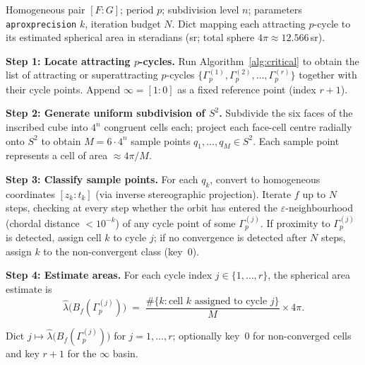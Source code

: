 \documentclass[12pt]{article}
\theoremstyle{definition}
\newcommand{\Bf}{B_f}
\newcommand{\hpair}{[F:G]}
\begin{document}
\begin{algorithm}[h]
\caption{Spherical basin measure for $p$-cycles of $f=\hpair$}
\label{alg:measure}
\begin{algorithmic}[1]
\Require Homogeneous pair $\hpair$; period $p$; subdivision level $n$;
         parameters \texttt{aproxprecision} $k$, iteration budget $N$.
\Ensure Dict mapping each attracting $p$-cycle to its estimated spherical
        area in steradians (sr; total sphere $4\pi\approx 12.566$\,sr).

\State \textbf{Step 1: Locate attracting $p$-cycles.}
  Run Algorithm~\ref{alg:critical} to obtain the list of attracting or
  superattracting $p$-cycles
  $\bigl\{\Gamma^{(1)}_p,\Gamma^{(2)}_p,\ldots,\Gamma^{(r)}_p\bigr\}$
  together with their cycle points.
  Append $\infty=[1:0]$ as a fixed reference point (index $r+1$).

\State \textbf{Step 2: Generate uniform subdivision of $S^2$.}
  Subdivide the six faces of the inscribed cube into $4^n$ congruent
  cells each; project each face-cell centre radially onto $S^2$ to
  obtain $M = 6\cdot4^n$ sample points $q_1,\ldots,q_M\in S^2$.
  Each sample point represents a cell of area $\approx 4\pi/M$.

\State \textbf{Step 3: Classify sample points.}
  For each $q_k$, convert to homogeneous coordinates $[z_k:t_k]$
  (via inverse stereographic projection).
  Iterate $f$ up to $N$ steps, checking at every step whether the orbit
  has entered the $\varepsilon$-neighbourhood (chordal distance
  $<10^{-k}$) of any cycle point of some $\Gamma^{(j)}_p$.
  If proximity to $\Gamma^{(j)}_p$ is detected, assign cell $k$ to
  cycle $j$; if no convergence is detected after $N$ steps, assign $k$
  to the non-convergent class (key~$0$).

\State \textbf{Step 4: Estimate areas.}
  For each cycle index $j\in\{1,\ldots,r\}$, the spherical area estimate is
  \begin{equation}\label{eq:mu_estimate}
    \hat\lambda\bigl(\Bf(\Gamma^{(j)}_p)\bigr)
    \;=\; \frac{\#\{k : \text{cell }k\text{ assigned to cycle }j\}}{M}
          \times 4\pi.
  \end{equation}

\State \Return Dict $j \mapsto \hat\lambda\bigl(\Bf(\Gamma^{(j)}_p)\bigr)$
        for $j=1,\ldots,r$; optionally key~$0$ for non-converged cells
        and key $r+1$ for the $\infty$ basin.
\end{algorithmic}
\end{algorithm}
\end{document}
